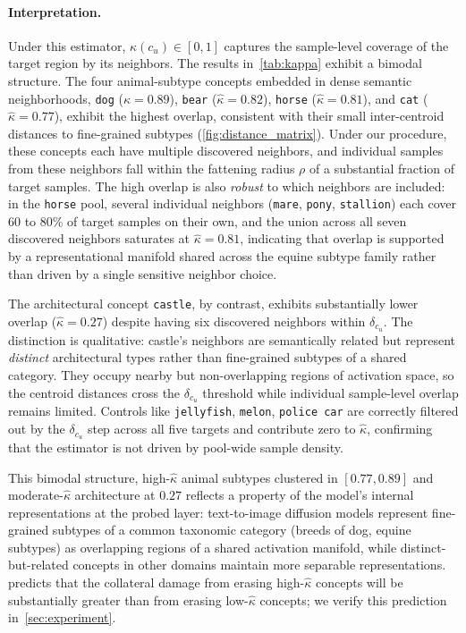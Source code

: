 \paragraph{Interpretation.}
Under this estimator, $\hat\kappa(c_u) \in [0, 1]$ captures the sample-level  coverage of the target region by its neighbors. The results in~\cref{tab:kappa} exhibit a bimodal structure. The four animal-subtype concepts embedded in dense semantic neighborhoods, \texttt{dog} ($\hat\kappa = 0.89$), \texttt{bear} ($\hat\kappa = 0.82$), \texttt{horse} ($\hat\kappa = 0.81$), and \texttt{cat} ($\hat\kappa = 0.77$), exhibit the  highest overlap, consistent with their small inter-centroid distances to fine-grained subtypes (\cref{fig:distance_matrix}). 
Under our procedure, these concepts each have multiple discovered neighbors, and individual samples from these neighbors fall within the fattening radius $\rho$ of a substantial fraction of target samples. The high overlap is also \emph{robust} to which neighbors are included: in the \texttt{horse} pool, several individual neighbors (\texttt{mare}, \texttt{pony}, \texttt{stallion}) each cover 60 to 80\% of target samples on their own, and the union across all seven discovered neighbors saturates at $\hat\kappa = 0.81$, indicating that overlap is supported by a representational manifold shared across the equine subtype family rather than driven by a single sensitive neighbor choice.

The architectural concept \texttt{castle}, by contrast, exhibits substantially lower overlap ($\hat\kappa = 0.27$) despite having six discovered neighbors within $\delta_{c_u}$. The distinction is qualitative: castle's neighbors are semantically related but represent \emph{distinct} architectural types rather than fine-grained subtypes of a shared category. They occupy nearby but non-overlapping regions of activation space, so the centroid distances cross the $\delta_{c_u}$ threshold while individual sample-level overlap remains limited. Controls like \texttt{jellyfish}, \texttt{melon}, \texttt{police car} are correctly filtered out by the $\delta_{c_u}$ step across all five targets and contribute zero to $\hat\kappa$, confirming that the estimator is not driven by pool-wide sample density.

This bimodal structure, high-$\hat\kappa$ animal subtypes clustered in $[0.77, 0.89]$ and moderate-$\hat\kappa$ architecture at $0.27$ reflects a property of the model's internal representations at the probed layer: text-to-image diffusion models represent fine-grained subtypes of a common taxonomic category (breeds of dog, equine subtypes) as overlapping regions of a shared activation manifold, while distinct-but-related concepts in other domains maintain more separable representations.  predicts that the collateral damage from erasing high-$\hat\kappa$ concepts will be substantially greater than from erasing low-$\hat\kappa$ concepts; we verify this prediction in~\cref{sec:experiment}.

